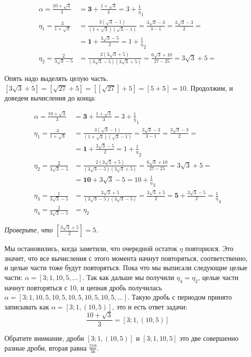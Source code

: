 \documentclass{article}
\newenvironment{exercise}{%
\begin{framed}\par\noindent\slshape%
}%
{\end{framed}}
\begin{document}
\begin{align*}
\alpha=\frac{10+\sqrt3}{3}&=\mathbf3 + \frac{1+\sqrt3}{3}=3+\frac1\eta_1\\
\eta_1=\frac3{1+\sqrt3}&=\frac{3(\sqrt3-1)}{(1+\sqrt3)(\sqrt3-1)}=
\frac{3\sqrt3-3}{3-1}=\frac{3\sqrt3-3}{2}=\\
&=\mathbf1+\frac{3\sqrt3-5}{2}=1+\frac1\eta_2\\
\eta_2=\frac2{3\sqrt3-5}&=\frac{2(3\sqrt3+5)}{(3\sqrt3-5)(3\sqrt3+5)}=\frac{6\sqrt3+10}{27 - 25}=3\sqrt3+5=
\end{align*}

Опять надо выделять целую часть. $[3\sqrt3+5]=[\sqrt{27}+5]=[[\sqrt{27}]+5]=[5+5]=10$. Продолжим, и доведем вычисления до конца:

\begin{align*}
\alpha=\frac{10+\sqrt3}{3}&=\mathbf3 + \frac{1+\sqrt3}{3}=3+\frac1\eta_1\\
\eta_1=\frac3{1+\sqrt3}&=\frac{3(\sqrt3-1)}{(1+\sqrt3)(\sqrt3-1)}=
\frac{3\sqrt3-3}{3-1}=\frac{3\sqrt3-3}{2}=\\
&=\mathbf1+\frac{3\sqrt3-5}{2}=1+\frac1\eta_2\\
\eta_2=\frac2{3\sqrt3-5}&=\frac{2(3\sqrt3+5)}{(3\sqrt3-5)(3\sqrt3+5)}=\frac{6\sqrt3+10}{27 - 25}=3\sqrt3+5=\\
&=\mathbf{10}+3\sqrt3-5=10+\frac1\eta_3\\
\eta_3=\frac1{3\sqrt3-5}&=\frac{3\sqrt3+5}{(3\sqrt3-5)(3\sqrt3-5)}=\frac{3\sqrt3+5}2=\mathbf5+\frac{3\sqrt3-5}2=\frac1\eta_4\\
\eta_4=\frac2{3\sqrt3-5}&=\eta_2
\end{align*}

\begin{exercise}%
Проверьте, что $\left[\frac{3\sqrt3+5}2\right]=5$.
\end{exercise}

Мы остановились, когда заметили, что очередной остаток $\eta$ повторился. Это значит, что все вычисления с этого момента начнут повторяться, соответственно, и целые части тоже будут повторяться. Пока что мы выписали следующие целые части:
$\alpha=[3;1,10,5,\ldots]$. Так как дальше мы получили $\eta_4=\eta_2$, целые части начнут повторяться с 10, и цепная дробь получилась $\alpha=[3;1,10,5,10,5,10,5,10,5,10,5,\ldots]$. Такую дробь с периодом принято записывать как $\alpha=[3;1,(10,5)]$, это и есть ответ задачи:
$$\frac{10+\sqrt3}{3}=[3;1,(10,5)]$$

Обратите внимание, дроби $[3;1,(10,5)]$ и $[3;1,10,5]$ это две совершенно разные дроби, вторая равна $\frac{219}{56}$.
\end{document}
